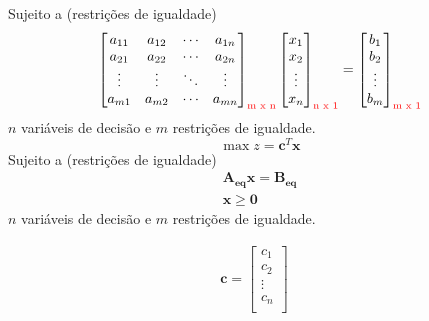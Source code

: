 \documentclass{beamer}
\begin{document}
\begin{frame}
\begin{mdframed}[backgroundcolor=blue!20]
{\begin{equation*}
			\end{equation*}
			{\color{red}Sujeito a (restrições de igualdade)} 
			\begin{equation*}
				\begin{bmatrix}
						a_{11} & a_{12} & \cdots & a_{1n} \\
						a_{21} & a_{22} & \cdots & a_{2n} \\
						\vdots & \vdots & \ddots & \vdots \\
						a_{m1} & a_{m2} & \cdots & a_{mn} \\
				\end{bmatrix}_{\text{\color{red}m x n}}
				\begin{bmatrix}
						x_1 \\
						x_2 \\
						\vdots \\
						x_n \\
				\end{bmatrix}_{\text{\color{red} n x 1}} = 
				\begin{bmatrix}
						b_1 \\
						b_2 \\
						\vdots \\
						b_m \\
				\end{bmatrix}_{\text{\color{red} m x 1}}  				
			\end{equation*}			
			$n$ variáveis de decisão e $m$ restrições de igualdade.
		}
		\only<5>
		{
			\begin{equation*} 
				\max z = \mathbf{c}^T \mathbf{x}
			\end{equation*}
			{\color{red}Sujeito a (restrições de igualdade)} 
			\begin{equation*}
				\begin{matrix}
					\mathbf{A_{eq}x} = \mathbf{B_{eq}}  \\
					\mathbf{x} \ge \mathbf{0}
				\end{matrix}
			\end{equation*}	
			$n$ variáveis de decisão e $m$ restrições de igualdade.		
		}		
	\end{mdframed}
	{
	\vspace{0.3cm}
	\begin{equation*}
		\begin{matrix}
			\mathbf{c} = 	\begin{bmatrix}
									c_1 \\ c_2 \\ \vdots \\ c_n \\
							\end{bmatrix} &


\end{matrix}
\end{equation*}}
\end{frame}
\end{document}
